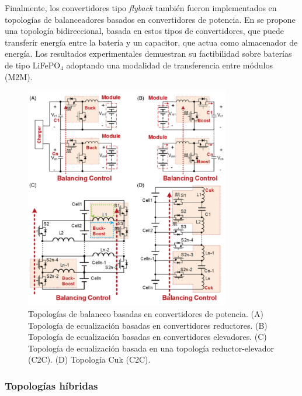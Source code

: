 \documentclass[10pt,a4paper]{article}
\begin{document}
Finalmente, los convertidores tipo \emph{flyback} tambi\'en fueron implementados
en topolog\'ias de balanceadores basados en convertidores de potencia. En
\cite{lin_et_al_bal_bid} se propone una topolog\'ia bidireccional, basada en 
estos tipos de convertidores, que puede transferir energ\'ia entre la bater\'ia y 
un capacitor, que actua como almacenador de energ\'ia. Los resultados 
experimentales demuestran su factibilidad sobre bater\'ias de tipo 
LiFeP$\mathrm{O_4}$ adoptando una modalidad de transferencia entre m\'odulos 
(\acrshort{M2M}).

\begin{figure}[h!]
    \begin{center}
        \includegraphics[width=0.8\textwidth]{pbbc_top.png}
        \caption{Topolog\'ias de balanceo basadas en convertidores de potencia.
                 (A) Topolog\'ia de ecualizaci\'on basadas en convertidores
                 reductores. (B) Topolog\'ia de ecualizaci\'on basadas en
                 convertidores elevadores. (C) Topolog\'ia de ecualizaci\'on
                 basada en una topolog\'ia reductor-elevador (\acrshort{C2C}).
                 (D) Topolog\'ia Cuk (\acrshort{C2C}).}
         \label{pbbc_top}
    \end{center}
\end{figure}
\FloatBarrier


\subsubsection{Topolog\'ias h\'ibridas}
\end{document}
